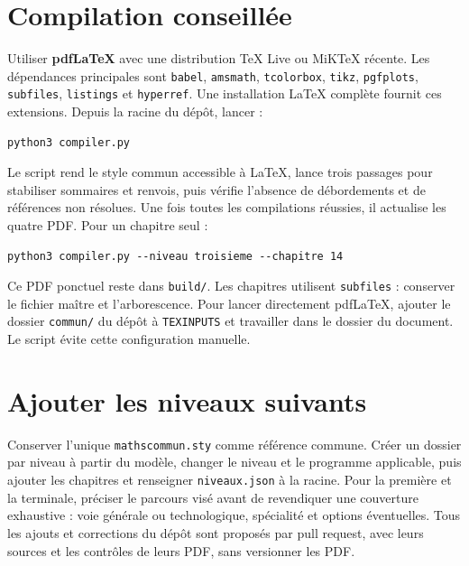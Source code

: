 \documentclass[11pt,a4paper,oneside]{book}
\begin{document}
\section{Compilation conseillée}
Utiliser \textbf{pdfLaTeX} avec une distribution TeX Live ou MiKTeX récente. Les dépendances principales sont \texttt{babel}, \texttt{amsmath}, \texttt{tcolorbox}, \texttt{tikz}, \texttt{pgfplots}, \texttt{subfiles}, \texttt{listings} et \texttt{hyperref}. Une installation LaTeX complète fournit ces extensions.
Depuis la racine du dépôt, lancer :
\begin{lstlisting}
python3 compiler.py
\end{lstlisting}
Le script rend le style commun accessible à LaTeX, lance trois passages pour stabiliser sommaires et renvois, puis vérifie l'absence de débordements et de références non résolues. Une fois toutes les compilations réussies, il actualise les quatre PDF. Pour un chapitre seul :
\begin{lstlisting}
python3 compiler.py --niveau troisieme --chapitre 14
\end{lstlisting}
Ce PDF ponctuel reste dans \texttt{build/}. Les chapitres utilisent \texttt{subfiles} : conserver le fichier maître et l'arborescence. Pour lancer directement pdfLaTeX, ajouter le dossier \texttt{commun/} du dépôt à \texttt{TEXINPUTS} et travailler dans le dossier du document. Le script évite cette configuration manuelle.
\section{Ajouter les niveaux suivants}
Conserver l'unique \texttt{mathscommun.sty} comme référence commune. Créer un dossier par niveau à partir du modèle, changer le niveau et le programme applicable, puis ajouter les chapitres et renseigner \texttt{niveaux.json} à la racine. Pour la première et la terminale, préciser le parcours visé avant de revendiquer une couverture exhaustive : voie générale ou technologique, spécialité et options éventuelles. Tous les ajouts et corrections du dépôt sont proposés par pull request, avec leurs sources et les contrôles de leurs PDF, sans versionner les PDF.
\end{document}
